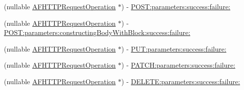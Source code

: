 \begin{Indent}
\begin{DoxyCompactItemize}
(nullable \mbox{\hyperlink{interface_a_f_h_t_t_p_request_operation}{A\+F\+H\+T\+T\+P\+Request\+Operation}} $\ast$) -\/ \mbox{\hyperlink{interface_a_f_h_t_t_p_request_operation_manager_ac8aa240cb2e04948dedabe61c29150f5}{P\+O\+S\+T\+:parameters\+:success\+:failure\+:}}
\item 
(nullable \mbox{\hyperlink{interface_a_f_h_t_t_p_request_operation}{A\+F\+H\+T\+T\+P\+Request\+Operation}} $\ast$) -\/ \mbox{\hyperlink{interface_a_f_h_t_t_p_request_operation_manager_a81aa57fcece5c05e1b6f4f7504c73703}{P\+O\+S\+T\+:parameters\+:constructing\+Body\+With\+Block\+:success\+:failure\+:}}
\item 
(nullable \mbox{\hyperlink{interface_a_f_h_t_t_p_request_operation}{A\+F\+H\+T\+T\+P\+Request\+Operation}} $\ast$) -\/ \mbox{\hyperlink{interface_a_f_h_t_t_p_request_operation_manager_aa3d3915a3f9bfb06fab881cf3a9affb3}{P\+U\+T\+:parameters\+:success\+:failure\+:}}
\item 
(nullable \mbox{\hyperlink{interface_a_f_h_t_t_p_request_operation}{A\+F\+H\+T\+T\+P\+Request\+Operation}} $\ast$) -\/ \mbox{\hyperlink{interface_a_f_h_t_t_p_request_operation_manager_a45781bd7d5d3ac10da2692964a5eb990}{P\+A\+T\+C\+H\+:parameters\+:success\+:failure\+:}}
\item 
(nullable \mbox{\hyperlink{interface_a_f_h_t_t_p_request_operation}{A\+F\+H\+T\+T\+P\+Request\+Operation}} $\ast$) -\/ \mbox{\hyperlink{interface_a_f_h_t_t_p_request_operation_manager_a5b264d221dc9185e642e11b86cfc4072}{D\+E\+L\+E\+T\+E\+:parameters\+:success\+:failure\+:}}
\end{DoxyCompactItemize}
\end{Indent}
